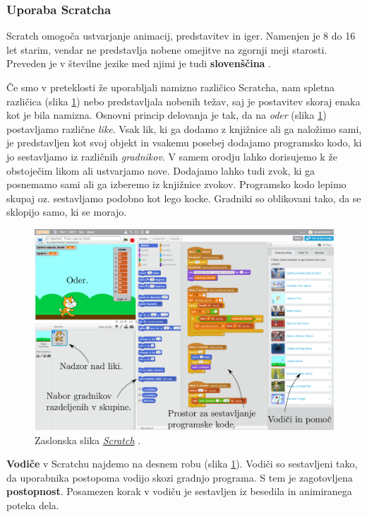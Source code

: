 \subsubsection{Uporaba Scratcha}
\label{sec:uporaba_scratcha}

Scratch omogoča ustvarjanje animacij, predstavitev in iger. Namenjen je
8 do 16 let starim, vendar ne predstavlja nobene omejitve na zgornji
meji starosti. Preveden je v številne jezike med njimi je tudi
\textbf{slovenščina} \cite{web:scratch:about}.

Če smo v preteklosti že uporabljali namizno različico Scratcha, nam
spletna različica (slika \ref{fig:web:scratch:orodje}) nebo predstavljala
nobenih težav, saj je postavitev skoraj enaka kot je bila
namizna. Osnovni princip delovanja je tak, da na \emph{oder} (slika
\ref{fig:web:scratch:orodje}) postavljamo različne \emph{like}. Vsak
lik, ki ga dodamo z knjižnice ali ga naložimo sami, je predstavljen
kot svoj objekt in vsakemu posebej dodajamo programsko kodo, ki jo
sestavljamo iz različnih \emph{gradnikov}. V samem orodju lahko
dorisujemo k že obstoječim likom ali ustvarjamo nove. Dodajamo lahko
tudi zvok, ki ga posnemamo sami ali ga izberemo iz knjižnice zvokov.
Programsko kodo lepimo skupaj oz. sestavljamo podobno kot lego
kocke. Gradniki so oblikovani tako, da se sklopijo samo, ki se morajo.

\begin{figure}[h!]
  \centering
    \includegraphics [width=0.90\linewidth, keepaspectratio =
   1] {./images/sc_web/scratch_orodje-v021.png}
   \caption{Zaslonska slika
     \emph{\href{https://scratch.mit.edu/}{Scratch}}
     \cite{web:scratch}.}
    \label{fig:web:scratch:orodje}
\end{figure}

\textbf{Vodiče} v Scratchu najdemo na desnem robu (slika
\ref{fig:web:scratch:orodje}). Vodiči so sestavljeni tako, da
uporabnika postopoma vodijo skozi gradnjo programa. S tem je
zagotovljena \textbf{postopnost}. Posamezen korak v vodiču je
sestavljen iz besedila in animiranega poteka dela.

